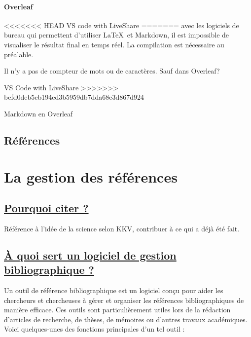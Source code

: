 \documentclass[
  letterpaper,
]{scrbook}
\begin{document}
\hypertarget{overleaf}{%
\subsubsection{Overleaf}\label{overleaf}}

<<<<<<< HEAD
VS code with LiveShare
=======
avec les logiciels de bureau qui permettent d'utiliser \LaTeX~et
Markdown, il est impossible de visualiser le résultat final en temps
réel. La compilation est nécessaire au préalable.

Il n'y a pas de compteur de mots ou de caractères. Sauf dans Overleaf?

VS Code with LiveShare
>>>>>>> befd0deb5cb194ed3b5959db7dda68e3d867d924

Markdown en Overleaf

\hypertarget{ruxe9fuxe9rences}{%
\section{Références}\label{ruxe9fuxe9rences}}


\hypertarget{sec-chap6}{%
\chapter{La gestion des références}\label{sec-chap6}}

\hypertarget{pourquoi-citer}{%
\section{\texorpdfstring{\ul{Pourquoi citer
?}}{Pourquoi citer ?}}\label{pourquoi-citer}}

Référence à l'idée de la science selon KKV, contribuer à ce qui a déjà
été fait.

\hypertarget{uxe0-quoi-sert-un-logiciel-de-gestion-bibliographique}{%
\section{\texorpdfstring{\ul{À quoi sert un logiciel de gestion
bibliographique
?}}{À quoi sert un logiciel de gestion bibliographique ?}}\label{uxe0-quoi-sert-un-logiciel-de-gestion-bibliographique}}

Un outil de référence bibliographique est un logiciel conçu pour aider
les chercheurs et chercheuses à gérer et organiser les références
bibliographiques de manière efficace. Ces outils sont particulièrement
utiles lors de la rédaction d'articles de recherche, de thèses, de
mémoires ou d'autres travaux académiques. Voici quelques-unes des
fonctions principales d'un tel outil :
\end{document}
